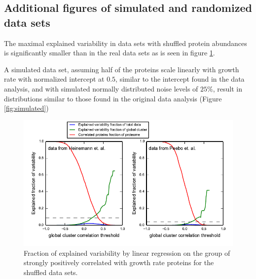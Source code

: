 \documentclass[a4paper]{article}
\begin{document}
\subsection{Additional figures of simulated and randomized data sets}
The maximal explained variability in data sets with shuffled protein abundances is significantly smaller than in the real data sets as is seen in figure \ref{fig:shuffledexpvar}.

A simulated data set, assuming half of the proteins scale linearly with growth rate with normalized intercept at $0.5$, similar to the intercept found in the data analysis, and with simulated normally distributed noise levels of $25\%$, result in distributions similar to those found in the original data analysis (Figure \ref{fig:simulated})

\begin{figure}[H]
\begin{center}
\includegraphics[width=1\columnwidth]{shuffleExpVar3.pdf}
\caption{\label{fig:shuffledexpvar}
Fraction of explained variability by linear regression on the group of strongly positively correlated with growth rate proteins for the shuffled data sets.
%
}
\end{center}
\end{figure}
\end{document}
